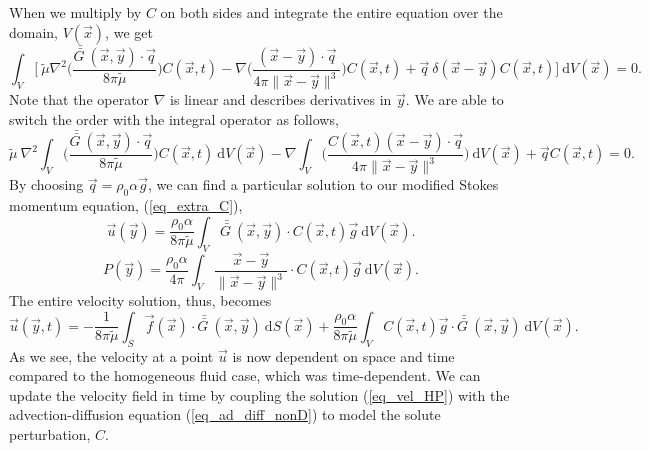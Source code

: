 When we multiply by $ C $ on both sides and integrate the entire equation over the domain, $V(\vec{x})$, we get
\begin{equation}
	\int_{V}
	\biggl[
	\ \tilde{\mu} \nabla^2 
	\biggl( \frac{ \bar{\bar{G \ }}(\vec{x}, \vec{y})
	\cdot  \vec{q}}{8\pi \tilde{\mu}}  \biggr)
	C(\vec{x}, t)
	-
	\nabla \biggl( 
	\frac{(\vec{x} - \vec{y}) \cdot  \vec{q} }{4 \pi \| \vec{x} - \vec{y}\|^3}
	\biggr)
	C(\vec{x}, t)
	+ \vec{q} \ \delta \left(\vec{x} - \vec{y} \right)
	C(\vec{x}, t)
	\biggr]
	\ \textrm{d}V(\vec{x}) = 0 .
\label{eq_single_stokes_sub2}
\end{equation}
Note that the operator $\nabla$ is linear and describes derivatives in $\vec{y}$. We are able to switch the order with the integral operator as follows,
\begin{equation}
	\tilde{\mu} \ \nabla^2 
	\int_{V}
	\biggl( \frac{\bar{\bar{G \ }}(\vec{x}, \vec{y})
	\cdot  \vec{q} }{8\pi \tilde{\mu}}  \biggr)
	C(\vec{x}, t)
	\ \textrm{d}V(\vec{x})
	-
	\nabla 
	\int_{V}
	\biggl(
	\frac{	C(\vec{x}, t)(\vec{x} - \vec{y})\cdot  \vec{q} }{4 \pi \| \vec{x} - \vec{y}\|^3} \biggr)
	\ \textrm{d}V(\vec{x})
	+\vec{q} C(\vec{x}, t) = 0 .
\label{eq_single_stokes_sub3}
\end{equation}
By choosing $\vec{q} = \rho_0 \alpha \vec{g}$, we can find a particular solution to our modified Stokes momentum equation, (\ref{eq_extra_C}),
\begin{equation}
	\vec{u} (\vec{y}) =
	 \frac{\rho_0 \alpha }{8\pi \tilde{\mu}}
	\int_{V}  \bar{\bar{G \ }}(\vec{x}, \vec{y})
	\cdot  C(\vec{x}, t) \vec{g} 
	\ \textrm{d}V(\vec{x}).
\label{eq_fund_soln_unit}
\end{equation}
\begin{equation}
	P(\vec{y}) = 
	\frac{\rho_0 \alpha }{4\pi }  
	\int_{V}
	\frac{\vec{x} - \vec{y}}{\| \vec{x} - \vec{y}\|^3}
	\cdot 
	C(\vec{x}, t) \vec{g} 
	\ \textrm{d}V(\vec{x}).
\label{eq_fund_soln_p}
\end{equation}
The entire velocity solution, thus, becomes
\begin{equation}
	 \vec{u} \left(\vec{y}, t \right) =
	 - \frac{1}{8 \pi \tilde{\mu}} \int_{S}  
		 \vec{f}(\vec{x}) 
		 \cdot \bar{\bar{G \ }} (\vec{x},\vec{y}) 
		 \ \textrm{d}S(\vec{x})
	+ \frac{ \rho_0 \alpha  }{8\pi \tilde{\mu}} \int_V  C \left(\vec{x},  t \right) \vec{g} \cdot 
	\bar{\bar{G \ }}(\vec{x}, \vec{y} ) 
	\ \text{d}V(\vec{x}).
\label{eq_vel_HP}
\end{equation}
As we see, the velocity at a point $\vec{u}$ is now dependent on space and time compared to the homogeneous fluid case, which was time-dependent. We can update the velocity field in time by coupling the solution (\ref{eq_vel_HP}) with the advection-diffusion equation (\ref{eq_ad_diff_nonD}) to model the solute perturbation, $C$.
 
